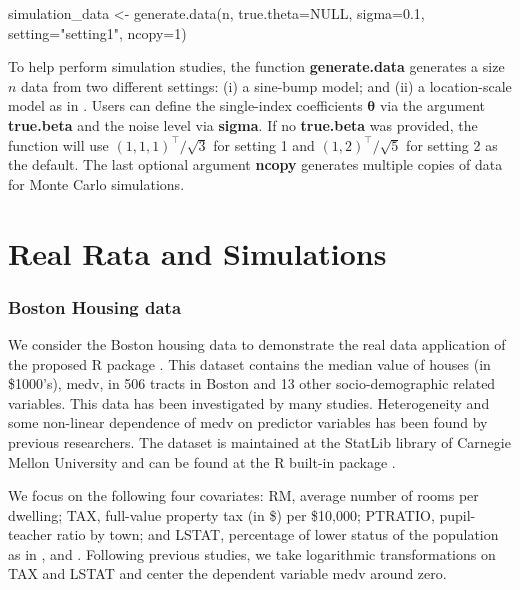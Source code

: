 \begin{example}
  simulation_data <- generate.data(n, true.theta=NULL, sigma=0.1, 
  setting="setting1", ncopy=1)
\end{example}

To help perform simulation studies, the function \textbf{generate.data} generates a size $n$ data from two different settings: (i) a sine-bump model; and (ii) a location-scale model as in \cite{wu_single-index_2010}. Users can define the single-index coefficients $\boldsymbol{\theta}$ via the argument \textbf{true.beta} and the noise level via \textbf{sigma}. If no \textbf{true.beta} was provided, the function will use $(1,1,1)^{\intercal} / \sqrt{3}$ for setting 1 and $(1,2)^{\intercal} / \sqrt{5}$ for setting 2 as the default. The last optional argument \textbf{ncopy} generates multiple copies of data for Monte Carlo simulations. 

\section{Real Rata and Simulations}

\subsubsection{Boston Housing data}

We consider the Boston housing data to demonstrate the real data application of the proposed R package . This dataset contains the median value of houses (in \$1000's), medv, in 506 tracts in Boston and 13 other socio-demographic related variables. This data has been investigated by many studies. Heterogeneity and some non-linear dependence of medv on predictor variables has been found by previous researchers. The dataset is maintained at the StatLib library of Carnegie Mellon University and can be found at the R built-in package .

We focus on the following four covariates: RM, average number of rooms per dwelling; TAX, full-value property tax (in \$) per \$10,000; PTRATIO, pupil-teacher ratio by town; and LSTAT, percentage of lower status of the population as in \cite{opsomer_fully_1998}, \cite{yu_local_2004} and \cite{wu_single-index_2010}. Following previous studies, we take logarithmic transformations on TAX and LSTAT and center the dependent variable medv around zero.

